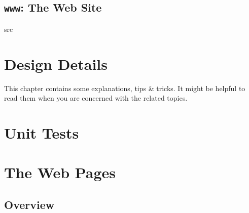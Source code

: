 \documentclass{extex-doc}
\begin{document}
\section{\texttt{www}: The Web Site}


\begin{description}
\item[src] 
\end{description}



\chapter{Design Details}

This chapter contains some explanations, tips \& tricks. It might be
helpful to read them when you are concerned with the related topics.





\chapter{Unit Tests}

\INCOMPLETE




\chapter{The Web Pages}

\section{Overview}
\end{document}
